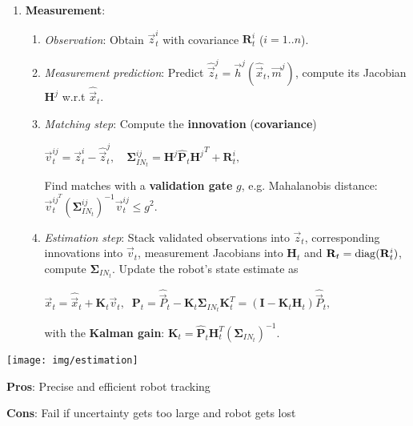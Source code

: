 \documentclass[fontsize=6pt]{scrartcl}
\newcommand{\mat}[1]{\mathbf{#1}}
\begin{document}
\begin{multicols*}{4}
\begin{enumerate}
	\item \textbf{Measurement}:

\begin{enumerate}
	\item \textit{Observation}: Obtain $\vec z_t^i$ with
	covariance $\mat R_t^i$ ($i=1..n$).
	\item \textit{Measurement prediction}: Predict $\hat{\vec{z}}_t^j = \vec{h}^j(\hat{\vec{x}}_t, \vec{m}^j)$,
	compute its Jacobian $\mat{H}^j$ w.r.t $\hat{\vec{x}}_t$.
	\item \textit{Matching step}: Compute the \textbf{innovation}
	(\textbf{covariance})

	\begin{center}
		$
		\vec{v}_t^{ij}=\vec{z}_t^i - \hat{\vec{z}}_t^j,\quad
		\mat{\Sigma}_{IN_t}^{ij} = \mat{H}^j \hat{\mat{P}}_t {\mat{H}^j}^T + \mat{R}_t^i,$
	\end{center}

	Find matches with a \textbf{validation gate} $g$, e.g. Mahalanobis distance:
	$\vec{v}_{t}^{{ij}^T} (\mat{\Sigma}_{IN_t}^{ij})^{-1} \vec{v}_t^{ij} \le g^2$.

	\item \textit{Estimation step}: Stack validated observations into $\vec{z}_t$, corresponding
	innovations into $\vec v_t$, measurement Jacobians into $\mat H_t$ and
	$\mat R_t = \diag(\mat R_t^i)$, compute $\mat \Sigma_{IN_t}$. Update the robot's
	state estimate as

	\begin{center}
		$
		\vec x_t = \hat{\vec x}_t + \mat K_t \vec v_t,\;\;
		\mat P_t = \hat{\vec P}_t - \mat K_t \mat{\Sigma}_{IN_t}\mat{K}_t^T = (\mat I - \mat K_t \mat H_t)\hat{\vec P}_t,
		$
	\end{center}

	with the \textbf{Kalman gain}: $
		\mat K_t = \hat{\mat{P}}_t \mat{H}_t^T (\mat{ \Sigma}_{IN_t})^{-1}.
		$
\end{enumerate}
\end{enumerate}

\begin{minipage}{0.75\linewidth}
	\texttt{[image: img/estimation]}
\end{minipage}
\begin{minipage}{0.24\linewidth}
		\textbf{Pros}: Precise and efficient robot tracking

		\textbf{Cons}: Fail if uncertainty gets too large and robot gets lost
\end{minipage}



\end{multicols*}
\end{document}
